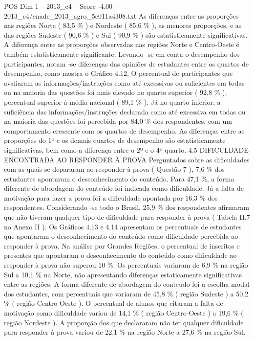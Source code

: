 \begin{textsample}{POS Dim 1 – 2013\_c4 – Score -4.00 – 2013\_c4/enade\_2013\_agro\_5c011a4308.txt}
As diferenças entre as proporções nas regiões Norte ( 83,5 \% ) e Nordeste ( 85,6 \% ), as menores proporções, e as das regiões Sudeste ( 90,6 \% ) e Sul ( 90,9 \% ) são estatisticamente significativas.
A diferença entre as proporções observadas nas regiões Norte e Centro-Oeste é também estatisticamente significante.
Levando -se em conta o desempenho dos participantes, notam -se diferenças das opiniões de estudantes entre os quartos de desempenho, como mostra o Gráfico 4.12.
O percentual de participantes que avaliaram as informações/instruções como até excessivas ou suficientes em todas ou na maioria das questões foi mais elevado no quarto superior ( 92,8 \% ), percentual superior à média nacional ( 89,1 \% ).
Já no quarto inferior, a suficiência das informações/instruções declarada como até excessiva em todas ou na maioria das questões foi percebida por 84,0 \% dos respondentes, com um comportamento crescente com os quartos de desempenho.
As diferenças entre as proporções do 1º e os demais quartos de desempenho são estatisticamente significativas, bem como a diferença entre o 2º e o 4º quarto. 4.5 DIFICULDADE ENCONTRADA AO RESPONDER À PROVA Perguntados sobre as dificuldades com as quais se depararam ao responder à prova ( Questão 7 ), 7,6 \% dos estudantes apontaram o desconhecimento do conteúdo.
Para 47,1 \%, a forma diferente de abordagem do conteúdo foi indicada como dificuldade.
Já a falta de motivação para fazer a prova foi a dificuldade apontada por 16,3 \% dos respondentes.
Considerando -se todo o Brasil, 25,9 \% dos respondentes afirmaram que não tiveram qualquer tipo de dificuldade para responder à prova ( Tabela II.7 no Anexo II ).
Os Gráficos 4.13 e 4.14 apresentam os percentuais de estudantes que apontaram o desconhecimento do conteúdo como dificuldade percebida ao responder à prova.
Na análise por Grandes Regiões, o percentual de inscritos e presentes que apontaram o desconhecimento do conteúdo como dificuldade ao responder à prova não superou 10 \%.
Os percentuais variaram de 6,9 \% na região Sul a 10,1 \% na Norte, não apresentando diferenças estaticamente significativas entre as regiões.
A forma diferente de abordagem do conteúdo foi a escolha modal dos estudantes, com percentuais que variaram de 45,8 \% ( região Sudeste ) a 50,2 \% ( região Centro-Oeste ).
O percentual de alunos que citaram a falta de motivação como dificuldade variou de 14,1 \% ( região Centro-Oeste ) a 19,6 \% ( região Nordeste ).
A proporção dos que declararam não ter qualquer dificuldade para responder à prova variou de 22,1 \% na região Norte a 27,6 \% na região Sul.

\end{textsample}
